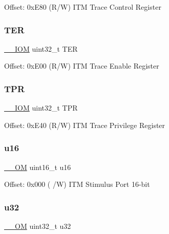 Offset\+: 0x\+E80 (R/W) I\+TM Trace Control Register \mbox{\label{struct_i_t_m___type_aa6530efad3a727fb3cc8f509403b9948}} 
\subsubsection{\texorpdfstring{T\+ER}{TER}}
{\footnotesize\ttfamily \mbox{\hyperlink{core__cm4_8h_ab6caba5853a60a17e8e04499b52bf691}{\+\_\+\+\_\+\+I\+OM}} uint32\+\_\+t T\+ER}

Offset\+: 0x\+E00 (R/W) I\+TM Trace Enable Register \mbox{\label{struct_i_t_m___type_afe5e266862734ca1082ceddff7180688}} 
\subsubsection{\texorpdfstring{T\+PR}{TPR}}
{\footnotesize\ttfamily \mbox{\hyperlink{core__cm4_8h_ab6caba5853a60a17e8e04499b52bf691}{\+\_\+\+\_\+\+I\+OM}} uint32\+\_\+t T\+PR}

Offset\+: 0x\+E40 (R/W) I\+TM Trace Privilege Register \mbox{\label{struct_i_t_m___type_ae93660eefe2482a8564fae9a1ca39739}} 
\subsubsection{\texorpdfstring{u16}{u16}}
{\footnotesize\ttfamily \mbox{\hyperlink{core__cm4_8h_a0ea2009ed8fd9ef35b48708280fdb758}{\+\_\+\+\_\+\+OM}} uint16\+\_\+t u16}

Offset\+: 0x000 ( /W) I\+TM Stimulus Port 16-\/bit \mbox{\label{struct_i_t_m___type_ae89dd50f788f12863c681fba1a5b60d1}} 
\subsubsection{\texorpdfstring{u32}{u32}}
{\footnotesize\ttfamily \mbox{\hyperlink{core__cm4_8h_a0ea2009ed8fd9ef35b48708280fdb758}{\+\_\+\+\_\+\+OM}} uint32\+\_\+t u32}


